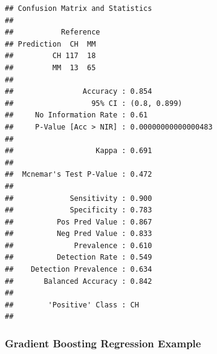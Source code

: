 \documentclass[
]{book}
\newenvironment{Shaded}{\begin{snugshade}}{\end{snugshade}}
\newcommand{\CommentTok}[1]{\textcolor[rgb]{0.56,0.35,0.01}{\textit{#1}}}
\newcommand{\DataTypeTok}[1]{\textcolor[rgb]{0.13,0.29,0.53}{#1}}
\newcommand{\DecValTok}[1]{\textcolor[rgb]{0.00,0.00,0.81}{#1}}
\newcommand{\KeywordTok}[1]{\textcolor[rgb]{0.13,0.29,0.53}{\textbf{#1}}}
\newcommand{\NormalTok}[1]{#1}
\newcommand{\OperatorTok}[1]{\textcolor[rgb]{0.81,0.36,0.00}{\textbf{#1}}}
\newcommand{\StringTok}[1]{\textcolor[rgb]{0.31,0.60,0.02}{#1}}
\begin{document}
\begin{Shaded}
\end{Shaded}

\begin{verbatim}
## Confusion Matrix and Statistics
## 
##           Reference
## Prediction  CH  MM
##         CH 117  18
##         MM  13  65
##                                              
##                Accuracy : 0.854              
##                  95% CI : (0.8, 0.899)       
##     No Information Rate : 0.61               
##     P-Value [Acc > NIR] : 0.00000000000000483
##                                              
##                   Kappa : 0.691              
##                                              
##  Mcnemar's Test P-Value : 0.472              
##                                              
##             Sensitivity : 0.900              
##             Specificity : 0.783              
##          Pos Pred Value : 0.867              
##          Neg Pred Value : 0.833              
##              Prevalence : 0.610              
##          Detection Rate : 0.549              
##    Detection Prevalence : 0.634              
##       Balanced Accuracy : 0.842              
##                                              
##        'Positive' Class : CH                 
## 
\end{verbatim}

\begin{Shaded}
\end{Shaded}

\hypertarget{gradient-boosting-regression-example}{%
\subsubsection{Gradient Boosting Regression Example}\label{gradient-boosting-regression-example}}
\end{document}
